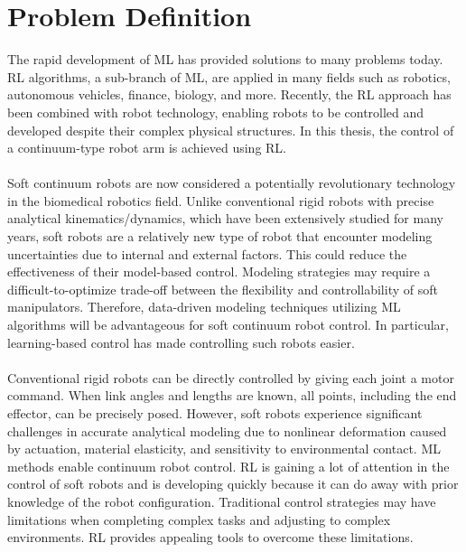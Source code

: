 \documentclass[12pt,twoside,a4]{mwbk}
\begin{document}
\section{Problem Definition}
The rapid development of ML has provided solutions to many problems today. RL algorithms, a sub-branch of ML, are applied in many fields such as robotics, autonomous vehicles, finance, biology, and more. Recently, the RL approach has been combined with robot technology, enabling robots to be controlled and developed despite their complex physical structures. In this thesis, the control of a continuum-type robot arm is achieved using RL.
\\ \\
Soft continuum robots are now considered a potentially revolutionary technology in the biomedical robotics field. Unlike conventional rigid robots with precise analytical kinematics/dynamics, which have been extensively studied for many years, soft robots are a relatively new type of robot that encounter modeling uncertainties due to internal and external factors. This could reduce the effectiveness of their model-based control. Modeling strategies may require a difficult-to-optimize trade-off between the flexibility and controllability of soft manipulators. Therefore, data-driven modeling techniques utilizing ML algorithms will be advantageous for soft continuum robot control. In particular, learning-based control has made controlling such robots easier.
\\ \\
Conventional rigid robots can be directly controlled by giving each joint a motor command. When link angles and lengths are known, all points, including the end effector, can be precisely posed. However, soft robots experience significant challenges in accurate analytical modeling due to nonlinear deformation caused by actuation, material elasticity, and sensitivity to environmental contact. ML methods enable continuum robot control. RL is gaining a lot of attention in the control of soft robots and is developing quickly because it can do away with prior knowledge of the robot configuration. Traditional control strategies may have limitations when completing complex tasks and adjusting to complex environments. RL provides appealing tools to overcome these limitations.
\\ \\
\end{document}
